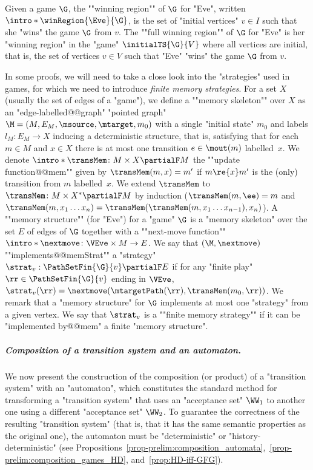 \documentclass{theoretics}
\begin{document}
\AP Given a game $\G$, the ""winning region"" of $\G$ for "Eve", written $\intro*\winRegion{\Eve}{\G}$, is the set of "initial vertices" $v\in I$ such that she "wins" the game $\G$ from $v$. %
\AP The ""full winning region"" of $\G$ for "Eve" is her "winning region" in the "game" $\initialTS{\G}{V}$ where all vertices are initial, that is, the set of vertices $v\in V$ such that "Eve" "wins" the game $\G$ from $v$. 

In some proofs, we will need to take a close look into the "strategies" used in games, for which we need to introduce \emph{finite memory strategies}.
\AP For a set $X$ (usually the set of edges of a "game"), we define a ""memory skeleton"" over $X$ as an "edge-labelled@@graph" "pointed graph" $\M = (M, E_M, \msource, \mtarget, m_0)$ with a single "initial state" $m_0$ and labels $l_M\colon E_M\to X$ inducing a deterministic structure, that is, satisfying that for each $m\in M$ and $x\in X$ there is at most one transition $e\in \mout(m)$ labelled~$x$.
\AP We denote $\intro*\transMem\colon M \times X \partialF M$ the ""update function@@mem"" given by $\transMem(m, x) = m'$ if $m\re{x}m'$ is the (only) transition from $m$ labelled~$x$. We extend $\transMem$ to $\transMem\colon M\times X^* \partialF M$ by induction ($\transMem(m,\ee) = m$ and $\transMem(m,x_1\dots x_n) = \transMem(\transMem(m,x_1\dots x_{n-1}),x_n)$).
\AP A ""memory structure"" (for "Eve") for  a "game" $\G$ is a "memory skeleton" over the set $E$ of edges of $\G$ together with a ""next-move function"" $\intro*\nextmove\colon \VEve\times M \to E$.
\AP We say that $(\M, \nextmove)$ ""implements@@memStrat"" a "strategy" $\strat_{v}: \PathSetFin{\G}{v}  \partialF E$  if for any "finite play" $\rr\in \PathSetFin{\G}{v}$ ending in $\VEve$, $\strat_{v}(\rr) = \nextmove(\mtargetPath(\rr), \transMem(m_0, \rr))$. We remark that a  "memory structure" for $\G$ implements at most one "strategy" from a given vertex.
We say that $\strat_{v}$ is a ""finite memory strategy"" if it can be "implemented by@@mem" a finite "memory structure".

\subparagraph*{Composition of a transition system and an automaton.}
We now present the construction of the composition (or product) of a "transition system" with an "automaton", which constitutes the standard method for transforming a "transition system" that uses an "acceptance set" $\WW_1$ to another one using a different "acceptance set" $\WW_2$. To guarantee the correctness of the resulting "transition system" (that is, that it has the same semantic properties as the original one), the automaton must be "deterministic" or "history-deterministic" (see Propositions~\ref{prop-prelim:composition_automata},~\ref{prop-prelim:composition_games_HD}, and~\ref{prop:HD-iff-GFG}). 
\end{document}
